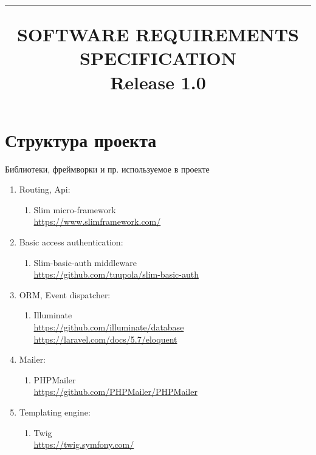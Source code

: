 \documentclass{scrreprt}
\title{%
\flushright
\rule{8cm}{1.5pt}\vskip1cm
\Huge{SOFTWARE REQUIREMENTS\\ SPECIFICATION}\\
\vspace{1.5cm}
\LARGE{Release 1.0\\}
}
\date{}
\begin{document}
\maketitle
\tableofcontents
\chapter{Структура проекта}
Библиотеки, фреймворки и пр. используемое в проекте

\begin{enumerate}[]
	\item Routing, Api:
	\begin{enumerate}[-]
	\item Slim micro-framework \\
		\url{https://www.slimframework.com/}
	\end{enumerate}

	\item Basic access authentication:
	\begin{enumerate}[-]
		\item Slim-basic-auth middleware \\
		\url{https://github.com/tuupola/slim-basic-auth}
	\end{enumerate}

	\item ORM, Event dispatcher:
	\begin{enumerate}[-]
		\item Illuminate \\
		\url{https://github.com/illuminate/database} \\
		\url{https://laravel.com/docs/5.7/eloquent}
	\end{enumerate}

	\item Mailer:
	\begin{enumerate}[-]
		\item PHPMailer \\
		\url{https://github.com/PHPMailer/PHPMailer}
	\end{enumerate}

	\item Templating engine:
	\begin{enumerate}[-]
		\item Twig \\
		\url{https://twig.symfony.com/}
	\end{enumerate}


\end{enumerate}
\end{document}
